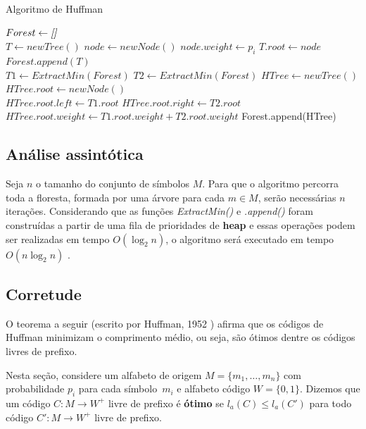 \begin{algorithm}[H]
\caption{Algoritmo de Huffman} \label{alg:huff}
\begin{algorithmic}
	\State $Forest \gets \emph{[]}$\\
	 
		\State $T \gets newTree()$
		\State $node \gets newNode()$
		\State $node.weight \gets p_i$ 
		\State $T.root \gets node$
		\State $Forest.append(T)$ 
	\EndFor \\
	
		\State $T1 \gets ExtractMin(Forest)$ 
		\State $T2 \gets ExtractMin(Forest)$
		\State $HTree \gets newTree()$
		\State $HTree.root \gets newNode()$ \\
		\State $HTree.root.left \gets T1.root$
		\State $HTree.root.right \gets T2.root$
		\State $HTree.root.weight \gets T1.root.weight + T2.root.weight$
		\State Forest.append(HTree) 
	\EndWhile
\end{algorithmic}
\end{algorithm}

\subsection{Análise assintótica}

Seja $n$ o tamanho do conjunto de símbolos $M$. Para que o algoritmo percorra toda a floresta, formada por uma árvore para cada $m \in M$, serão necessárias $n$ iterações. Considerando que as funções \emph{ExtractMin()} e \emph{.append()} foram construídas a partir de uma fila de prioridades de \textbf{heap} e essas operações podem ser realizadas em tempo $O(\log_2 n)$, o algoritmo será executado em tempo $O(n\log_2 n)$ \cite{Ble}.

\subsection{Corretude}
O teorema a seguir (escrito por Huffman, 1952 \cite{Huff}) afirma
que os códigos de Huffman minimizam o comprimento médio, ou seja, são
ótimos dentre os códigos livres de prefixo.

Nesta seção, considere um alfabeto de origem $M = \{m_1,\dotsc, m_n\}$
com probabilidade $p_i$ para cada símbolo~$m_i$ e alfabeto código $W =
\{0,1\}$. Dizemos que um código $C: M\to W^+$ livre de prefixo é
\textbf{ótimo} se $l_a(C) \leq l_a(C')$ para todo código $C': M\to
W^+$ livre de prefixo.

